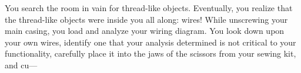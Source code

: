 You search the room in vain for thread-like objects.
Eventually, you realize that the thread-like objects were inside you all along:
wires!
While unscrewing your main casing,
you load and analyze your wiring diagram.
You look down upon your own wires,
identify one that your analysis determined is not critical to your functionality,
carefully place it into the jaws of the scissors from your sewing kit,
and cu---

\segfault


